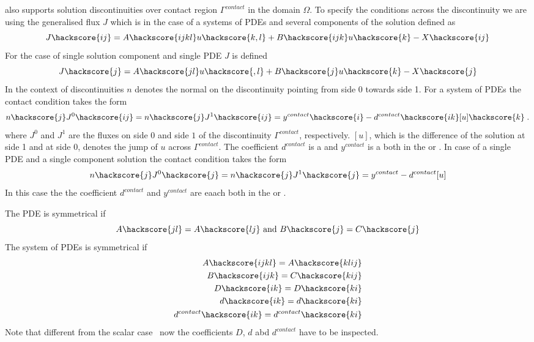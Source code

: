\LinearPDE also supports solution discontinuities  over contact region $\Gamma^{contact}$
in the domain $\Omega$. To specify the conditions across the discontinuity we are using the
generalised flux $J$ which is in the case of a systems of PDEs and several components of the solution
defined as
\begin{equation}\label{LINEARPDE.SYSTEM.5}
J\hackscore{ij}=A\hackscore{ijkl}u\hackscore{k,l}+B\hackscore{ijk}u\hackscore{k}-X\hackscore{ij}
\end{equation}
For the case of single solution component and single PDE $J$ is defined
\begin{equation}\label{LINEARPDE.SINGLE.5}
J\hackscore{j}=A\hackscore{jl}u\hackscore{,l}+B\hackscore{j}u\hackscore{k}-X\hackscore{j}
\end{equation}
In the context of discontinuities  $n$ denotes the normal on the
discontinuity pointing from side 0 towards side 1. For a system of PDEs
the contact condition takes the form
\begin{equation}\label{LINEARPDE.SYSTEM.6}
n\hackscore{j} J^{0}\hackscore{ij}=n\hackscore{j} J^{1}\hackscore{ij}=y^{contact}\hackscore{i} - d^{contact}\hackscore{ik} [u]\hackscore{k} \; .
\end{equation}
where $J^{0}$ and $J^{1}$ are the fluxes on side $0$ and side $1$ of the
discontinuity $\Gamma^{contact}$, respectively. $[u]$, which is the difference
of the solution at side 1 and at side 0, denotes the jump of $u$ across $\Gamma^{contact}$.
The coefficient $d^{contact}$ is a \RankTwo and $y^{contact}$ is a
\RankOne both in the \FunctionOnContactZero or \FunctionOnContactOne.
In case of a single PDE and a single component solution the contact condition takes the form
\begin{equation}\label{LINEARPDE.SINGLE.6}
n\hackscore{j} J^{0}\hackscore{j}=n\hackscore{j} J^{1}\hackscore{j}=y^{contact} - d^{contact}[u]
\end{equation}
In this case the the coefficient $d^{contact}$ and $y^{contact}$ are eaach \Scalar
both in the \FunctionOnContactZero or \FunctionOnContactOne.

The PDE is symmetrical  if
\begin{equation}\label{LINEARPDE.SINGLE.4}
A\hackscore{jl}=A\hackscore{lj} \mbox{ and } B\hackscore{j}=C\hackscore{j}
\end{equation}
The system of PDEs is symmetrical  if
\begin{eqnarray}
\label{LINEARPDE.SYSTEM.4}
A\hackscore{ijkl}=A\hackscore{klij} \\
B\hackscore{ijk}=C\hackscore{kij} \\
D\hackscore{ik}=D\hackscore{ki} \\
d\hackscore{ik}=d\hackscore{ki} \\
d^{contact}\hackscore{ik}=d^{contact}\hackscore{ki}
\end{eqnarray}
Note that different from the scalar case~ now the coefficients $D$, $d$ abd $d^{contact}$
have to be inspected.


